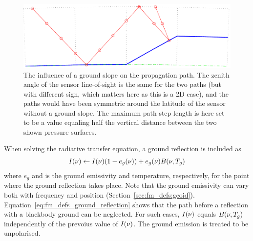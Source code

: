  \begin{figure}[!t]
  \begin{center}
   \includegraphics*[width=0.95\hsize]{Figs/fm_definitions/ppath_cases2}
   \caption{The influence of a ground slope on the propagation path. The zenith
     angle of the sensor line-of-sight is the same for the two paths (but with
     different sign, which matters here as this is a 2D case), and the paths
     would have been symmetric around the latitude of the sensor without a 
     ground slope. The maximum path step length is here set to be a value
     equaling half the vertical distance between the two shown pressure
     surfaces.}
   \label{fig:fm_defs:ppath_cases2}
  \end{center}
 \end{figure}

When solving the radiative transfer equation, a ground reflection is
included as
\begin{equation}
  I(\nu) \gets I(\nu)(1-e_g(\nu)) + e_g(\nu)B(\nu,T_{g})
  \label{eq:fm_defs_ground_reflection}
\end{equation}
where $e_g$ and  is the ground emissivity and temperature,
respectively, for the point where the ground reflection takes place.
Note that the ground emissivity can vary both with frequency and
position (Section~\ref{sec:fm_defs:geoid}).
Equation~\ref{eq:fm_defs_ground_reflection} shows that the path before
a reflection with a blackbody ground can be neglected. For such cases,
$I(\nu)$ equals $B(\nu,T_{g})$ independently of the prevoius
value of $I(\nu)$. The ground emission is treated to be
unpolarised.

